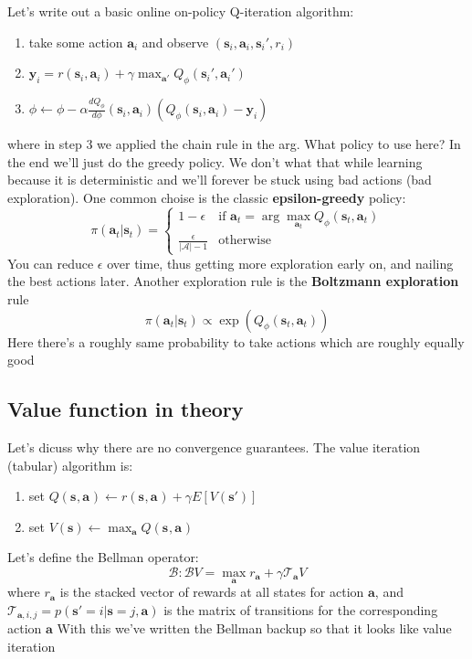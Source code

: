 \documentclass{report}
\newcommand{\argmax}{\arg\!\max}
\begin{document}
Let's write out a basic online on-policy Q-iteration algorithm:
\begin{enumerate}
\label{eq:online_q_iteration_algorithm}
\item take some action $\bm{a}_i$ and observe $\left( \bm{s}_i, \bm{a}_i, \bm{s}_i', r_i \right) $
\item $ \bm{y}_i = r(\bm{s}_{i}, \bm{a}_{i}) + \gamma \max_{\bm{a}'} Q_\phi (\bm{s}_{i}', \bm{a}_{i}') $
\item $ \phi \leftarrow \phi  - \alpha \frac{d Q_\phi}{d\phi} (\bm{s}_{i}, \bm{a}_{i}) \left( Q_\phi(\bm{s}_{i}, \bm{a}_{i}) - \bm{y}_i \right)  $
\end{enumerate}
where in step 3 we applied the chain rule in the arg.
What policy to use here? In the end we'll just do the greedy policy.
We don't what that while learning because it is deterministic and we'll forever be stuck using bad actions (bad exploration).
One common choise is the classic \textbf{epsilon-greedy} policy:
\begin{equation}
\pi(\bm{a}_{t}| \bm{s}_{t}) = 
\left\{
		\begin{array}{ll}
				1 - \epsilon & \text{if } \bm{a}_t = \argmax_{\bm{a}_t} Q_\phi(\bm{s}_{t}, \bm{a}_{t}) \\
				\frac{\epsilon}{|\mathcal{A}| - 1} & \text{otherwise}
\end{array}
		\right.
\end{equation}
You can reduce $\epsilon$ over time, thus getting more exploration early on, and nailing the best actions later.
Another exploration rule is the \textbf{Boltzmann exploration} rule
\begin{equation}
\pi(\bm{a}_{t}| \bm{s}_{t}) \propto \exp \left( Q_\phi(\bm{s}_{t}, \bm{a}_{t}) \right) 
\end{equation}
Here there's a roughly same probability to take actions which are roughly equally good

\subsection{Value function in theory}
Let's dicuss why there are no convergence guarantees.
The value iteration (tabular) algorithm is:
\begin{enumerate}
		\item set $Q(\bm{s}_{}, \bm{a}_{}) \leftarrow r(\bm{s}_{}, \bm{a}_{}) + \gamma E[V(\bm{s}')] $
		\item set $V(\bm{s}) \leftarrow \max_{\bm{a}} Q(\bm{s}_{}, \bm{a}_{})$
\end{enumerate}
Let's define the Bellman operator:
\begin{equation}
		\mathcal{B}: \mathcal{B}V = \max_{\bm{a}} r_{\bm{a}} + \gamma \mathcal{T}_{\bm{a}}V
\end{equation}
where $r_{\bm{a}}$ is the stacked vector of rewards at all states for action $\bm{a}$,
and $\mathcal{T}_{\bm{a},i,j} = p (\bm{s}' = i | \bm{s} = j, \bm{a}) $ is the matrix of transitions for the corresponding action $\bm{a}$  
With this we've written the Bellman backup so that it looks like value iteration
\end{document}
